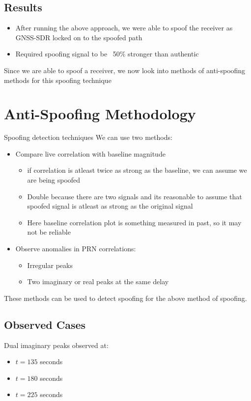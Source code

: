 \documentclass[12pt]{report}
\begin{document}
\subsection{Results}
\begin{itemize}
  \item After running the above approach, we were able to spoof the receiver as GNSS-SDR locked on to the spoofed path
  \item Required spoofing signal to be ~50\% stronger than authentic
\end{itemize}

\noindent Since we are able to spoof a receiver, we now look into methods of anti-spoofing methods for this spoofing technique

\section{Anti-Spoofing Methodology}
Spoofing detection techniques
We can use two methods:
\begin{itemize}
  \item Compare live correlation with baseline magnitude
  \begin{itemize}
    \item if correlation is atleast twice as strong as the baseline, we can assume we are being spoofed
    \item Double because there are two signals and its reasonable to assume that spoofed signal is atleast as strong as the original signal
    \item Here baseline correlation plot is something measured in past, so it may not be reliable
  \end{itemize}
  \item Observe anomalies in PRN correlations:
      \begin{itemize}
        \item Irregular peaks
        \item Two imaginary or real peaks at the same delay
      \end{itemize}
\end{itemize}

These methods can be used to detect spoofing for the above method of spoofing.

\subsection{Observed Cases}
Dual imaginary peaks observed at:
\begin{itemize}
  \item $t = 135$ seconds
  \item $t = 180$ seconds
  \item $t = 225$ seconds
\end{itemize}
\end{document}
